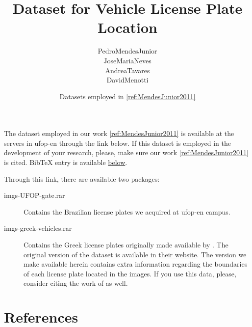 

% 

\title{Dataset for Vehicle License Plate Location}
\author{\gls{PedroMendesJunior}\\%
  \gls{JoseMariaNeves}\\%
  \gls{AndreaTavares}\\%
  \gls{DavidMenotti}\\%
}
\date{Datasets employed in \ref{ref:MendesJunior2011}}




\maketitle

The dataset employed in our work \ref{ref:MendesJunior2011} is available at the servers in \gls{ufop-en} through the link below.
If this dataset is employed in the development of your research, please, make sure our work \ref{ref:MendesJunior2011} is cited.
BibTeX entry is available \hyperref[ref:MendesJunior2011]{below}.

\begin{center}
\end{center}

Through this link, there are available two packages:

\begin{description}
\item[imgs-UFOP-gate.rar]
  Contains the Brazilian license plates we acquired at \gls{ufop-en} campus.
\item[imgs-greek-vehicles.rar]
  Contains the Greek license plates originally made available by .
  The original version of the dataset is available in \href{http://www.medialab.ntua.gr/research/LPRdatabase.html}{their website}.
  The version we make available herein contains extra information regarding the boundaries of each license plate located in the images.
  If you use this data, please, consider citing the work of  as well.
\end{description}

\section*{References}

